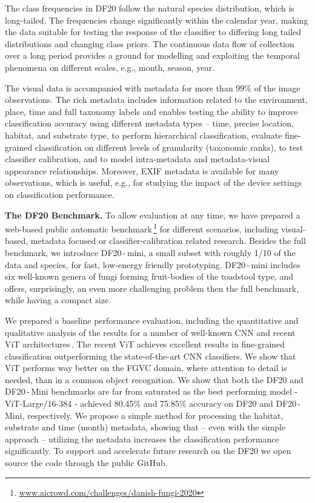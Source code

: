 \documentclass[10pt,twocolumn,letterpaper]{article}
\begin{document}
The class frequencies in DF20 follow the natural species distribution, which is long-tailed. The frequencies change significantly within the calendar year, making the data suitable for testing the response of the classifier to differing long tailed distributions and changing class priors. 
The continuous data flow of collection over a long period provides a ground for modelling and exploiting the temporal phenomena on different scales, e.g., month, season, year.

The visual data is accompanied with metadata for more than 99\% of the image observations. The rich metadata includes information related to the environment, place, time and full taxonomy labels and enables testing the ability to improve classification accuracy using different metadata types -- time, precise location, habitat, and substrate type, to perform hierarchical classification, evaluate fine-grained classification on different levels of granularity (taxonomic ranks), to test classifier calibration, and to model intra-metadata and metadata-visual appearance relationships.
Moreover, EXIF metadata is available for many observations, which is useful, e.g., for studying the impact of the device settings on classification performance.

\textbf{The DF20 Benchmark.}
To allow evaluation at any time, we have prepared a web-based public automatic benchmark\,\footnote{\url{www.aicrowd.com/challenges/danish-fungi-2020}} for different scenarios, including visual-based, metadata focused or classifier-calibration related research.
Besides the full benchmark, we introduce DF20\,-\,mini, a small subset with roughly 1/10 of the data and species, for fast, low-energy friendly prototyping. DF20\,-\,mini includes six well-known genera of fungi forming fruit-bodies of the toadstool type, and offers, surprisingly, an even more challenging problem then the full benchmark, while having a compact size. 

We prepared a baseline performance evaluation, including the quantitative and qualitative analysis of the results for a number of well-known CNN and recent ViT architectures\,\cite{vit}. The recent ViT achieves excellent results in fine-grained classification outperforming the state-of-the-art CNN classifiers. We show that ViT performs way better on the FGVC domain, where attention to detail is needed, than in a common object recognition. 
We show that both the DF20 and DF20\,-\,Mini benchmarks are far from saturated as the best performing model - ViT-Large/16-384 - achieved 80.45\% and 75.85\% accuracy on DF20 and DF20\,-\,Mini, respectively.  
We propose a simple method for processing the habitat, substrate and time (month) metadata, showing that -- even with the simple approach -- utilizing the metadata increases the classification performance significantly. To support and accelerate future research on the DF20 we open source the code through the public GitHub.
\end{document}
